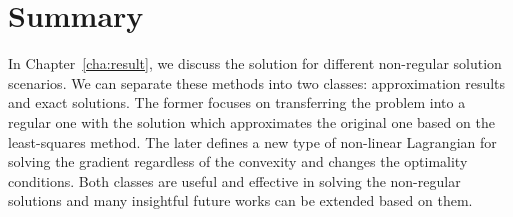 \section{Summary}
In Chapter~\ref{cha:result}, we discuss the solution for different non-regular solution scenarios. We can separate these methods into two classes: approximation results and exact solutions. The former focuses on transferring the problem into a regular one with the solution which approximates the original one based on the least-squares method. The later defines a new type of non-linear Lagrangian for solving the gradient regardless of the convexity and changes the optimality conditions. Both classes are useful and effective in solving the non-regular solutions and many insightful future works can be extended based on them. 
